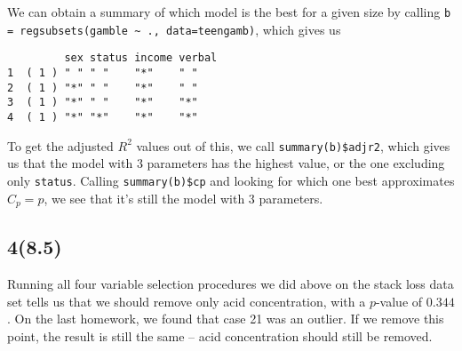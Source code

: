 \documentclass{article}
\begin{document}
We can obtain a summary of which model is the best for a given size by calling \verb|b = regsubsets(gamble ~ ., data=teengamb)|, which gives us
\begin{verbatim}
         sex status income verbal
1  ( 1 ) " " " "    "*"    " "   
2  ( 1 ) "*" " "    "*"    " "   
3  ( 1 ) "*" " "    "*"    "*"   
4  ( 1 ) "*" "*"    "*"    "*" 
\end{verbatim}
To get the adjusted $R^2$ values out of this, we call \verb|summary(b)$adjr2|, which gives us that the model with $3$ parameters has the highest value, or the one excluding only \verb|status|.
Calling \verb|summary(b)$cp| and looking for which one best approximates $C_p=p$, we see that it's still the model with $3$ parameters.
\subsection*{4(8.5)}
Running all four variable selection procedures we did above on the stack loss data set tells us that we should remove only acid concentration, with a $p$-value of $0.344$. On the last homework, we found that case 21 was an outlier. If we remove this point, the result is still the same -- acid concentration should still be removed.
\end{document}
